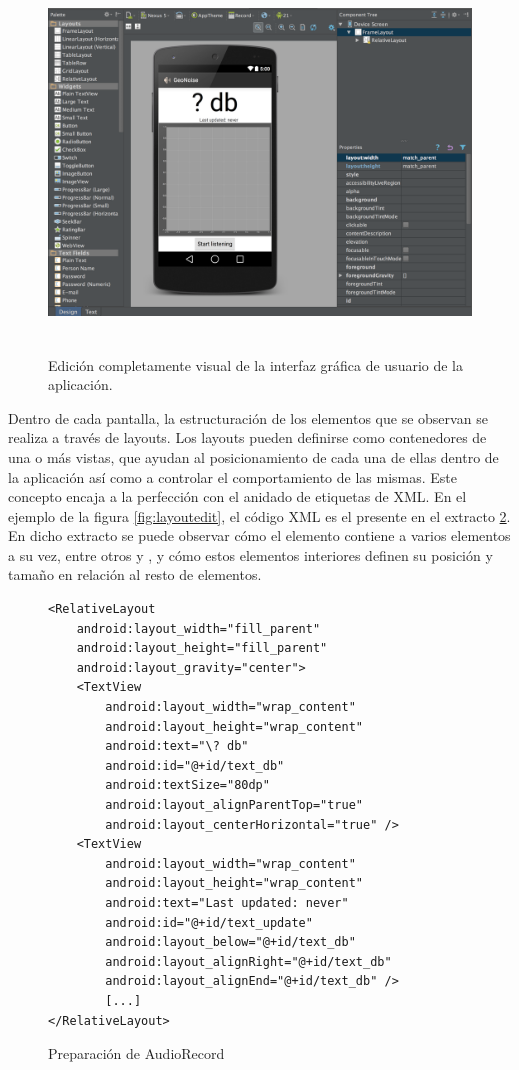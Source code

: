  \begin{figure}[H] \centering
    \includegraphics[height=10cm]{graphs/layoutvisual.png} \caption{Edición completamente visual de la interfaz gráfica de usuario de la aplicación.}\label{fig:layoutvisual}
\end{figure}

Dentro de cada pantalla, la estructuración de los elementos que se observan se realiza a través de layouts. Los layouts pueden definirse como contenedores de una o más vistas, que ayudan al posicionamiento de cada una de ellas dentro de la aplicación así como a controlar el comportamiento de las mismas. Este concepto encaja a la perfección con el anidado de etiquetas de XML. En el ejemplo de la figura \ref{fig:layoutedit}, el código XML es el presente en el extracto \ref{code:layout}. En dicho extracto se puede observar cómo el elemento  contiene a varios elementos a su vez, entre otros  y , y cómo estos elementos interiores definen su posición y tamaño en relación al resto de elementos. 

\begin{figure}[H] 
\begin{verbatim}
<RelativeLayout
    android:layout_width="fill_parent"
    android:layout_height="fill_parent"
    android:layout_gravity="center">
    <TextView
        android:layout_width="wrap_content"
        android:layout_height="wrap_content"
        android:text="\? db"
        android:id="@+id/text_db"
        android:textSize="80dp"
        android:layout_alignParentTop="true"
        android:layout_centerHorizontal="true" />
    <TextView
        android:layout_width="wrap_content"
        android:layout_height="wrap_content"
        android:text="Last updated: never"
        android:id="@+id/text_update"
        android:layout_below="@+id/text_db"
        android:layout_alignRight="@+id/text_db"
        android:layout_alignEnd="@+id/text_db" />
        [...]
</RelativeLayout>
\end{verbatim}
\caption{Preparación de AudioRecord}
\label{code:layout}
\end{figure}

